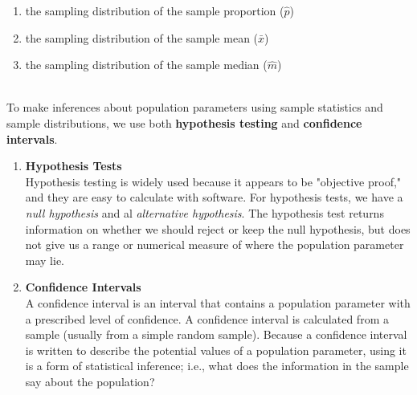 \documentclass{article}
\begin{document}
  \begin{enumerate}
    \item the sampling distribution of the sample proportion ($\hat{p}$)
    \item the sampling distribution of the sample mean ($\bar{x}$)
    \item the sampling distribution of the sample median ($\hat{m}$)
  \end{enumerate}
  \\ To make inferences about population parameters using sample statistics and sample distributions, we use both \textbf{hypothesis testing} and \textbf{confidence intervals}.
  \begin{enumerate}
    \item \textbf{Hypothesis Tests}
      \\ Hypothesis testing is widely used because it appears to be
"objective proof," and they are easy to calculate with software. For hypothesis tests, we have a \emph{null hypothesis} and al \emph{alternative hypothesis}. The hypothesis test returns information on whether we should reject or keep the null hypothesis, but does not give us a range or numerical measure of where the population parameter may lie.
    \item \textbf{Confidence Intervals}
      \\ A confidence interval is an interval that contains a population
parameter with a prescribed level of confidence. A confidence interval is calculated from a sample (usually
from a simple random sample). Because a confidence interval is written to describe the
potential values of a population parameter, using it is a
form of statistical inference; i.e., what does the information in the sample say about the
population?
  \end{enumerate}
\end{document}
